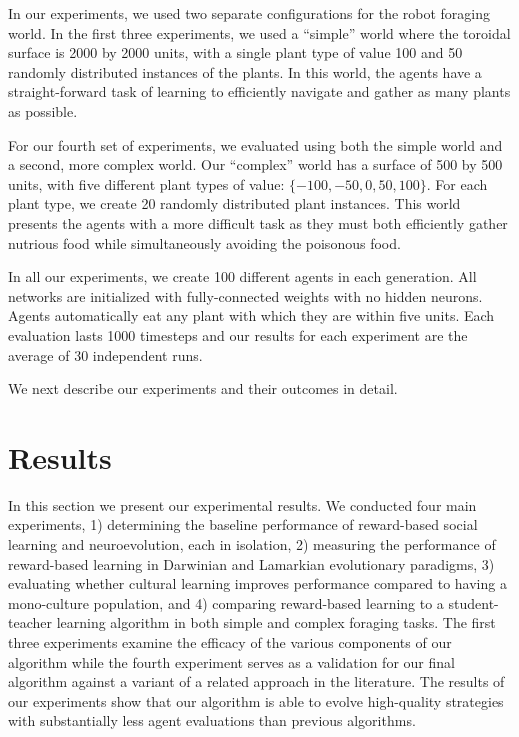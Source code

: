 \documentclass{acm_proc_article-sp}
\begin{document}
In our experiments, we used two separate configurations for the robot foraging world. In the first three experiments, we used a ``simple'' world where the toroidal surface is 2000 by 2000 units, with a single plant type of value 100 and 50 randomly distributed instances of the plants. In this world, the agents have a straight-forward task of learning to efficiently navigate and gather as many plants as possible.

For our fourth set of experiments, we evaluated using both the simple world and a second, more complex world. Our ``complex'' world has a surface of 500 by 500 units, with five different plant types of value: $\{-100, -50, 0, 50, 100\}$. For each plant type, we create 20 randomly distributed plant instances. This world presents the agents with a more difficult task as they must both efficiently gather nutrious food while simultaneously avoiding the poisonous food.

In all our experiments, we create 100 different agents in each generation. All networks are initialized with fully-connected weights with no hidden neurons. Agents automatically eat any plant with which they are within five units. Each evaluation lasts 1000 timesteps and our results for each experiment are the average of 30 independent runs.

We next describe our experiments and their outcomes in detail.


\section{Results}
\label{sec:results}
In this section we present our experimental results. We conducted four main experiments, 1) determining the baseline performance of reward-based social learning and neuroevolution, each in isolation, 2) measuring the performance of reward-based learning in Darwinian and Lamarkian evolutionary paradigms, 3) evaluating whether cultural learning improves performance compared to having a mono-culture population, and 4) comparing reward-based learning to a student-teacher learning algorithm in both simple and complex foraging tasks. The first three experiments examine the efficacy of the various components of our algorithm while the fourth experiment serves as a validation for our final algorithm against a variant of a related approach in the literature. The results of our experiments show that our algorithm is able to evolve high-quality strategies with substantially less agent evaluations than previous algorithms.
\end{document}
